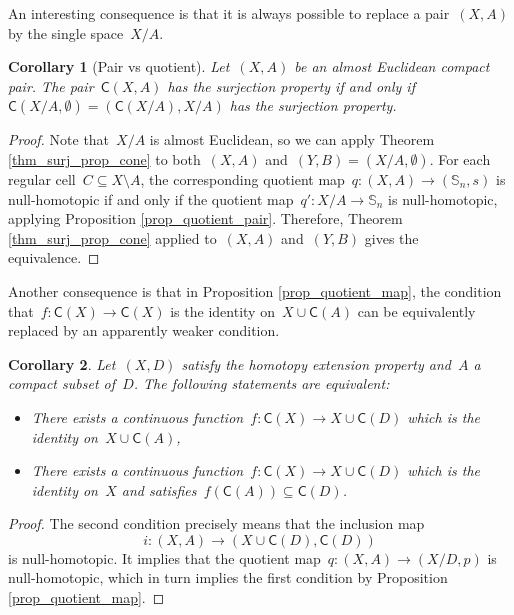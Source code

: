 \documentclass[english,11pt]{article}
\theoremstyle{plain}
\newtheorem{corollary}{Corollary}[section]
\theoremstyle{remark}
\theoremstyle{definition}
\newcommand{\Sp}{\mathbb{S}}
\newcommand{\C}[1]{\mathsf{C}(#1)}%
\begin{document}
An interesting consequence is that it is always possible to replace a pair~$(X,A)$ by the single space~$X/A$.
\begin{corollary}[Pair vs quotient]
Let~$(X,A)$ be an almost Euclidean compact pair. The pair~$\C{X,A}$ has the surjection property if and only if~$\C{X/A,\emptyset}=(\C{X/A},X/A)$ has the surjection property.
\end{corollary}
\begin{proof}
Note that~$X/A$ is almost Euclidean, so we can apply Theorem \ref{thm_surj_prop_cone} to both~$(X,A)$ and~$(Y,B)=(X/A,\emptyset)$. For each regular cell~$C\subseteq X\setminus A$, the corresponding quotient map~$q:(X,A)\to (\Sp_n,s)$ is null-homotopic if and only if the quotient map~$q':X/A\to\Sp_n$ is null-homotopic, applying Proposition \ref{prop_quotient_pair}. Therefore, Theorem \ref{thm_surj_prop_cone} applied to~$(X,A)$ and~$(Y,B)$ gives the equivalence.
\end{proof}

Another consequence is that in Proposition \ref{prop_quotient_map}, the condition that~$f:\C{X}\to\C{X}$ is the identity on~$X\cup \C{A}$ can be equivalently replaced by an apparently weaker condition.
\begin{corollary}
Let~$(X,D)$ satisfy the homotopy extension property and~$A$ a compact subset of~$D$. The following statements are equivalent:
\begin{itemize}
\item There exists a continuous function~$f:\C{X}\to X\cup\C{D}$ which is the identity on~$X\cup\C{A}$,
\item There exists a continuous function~$f:\C{X}\to X\cup\C{D}$ which is the identity on~$X$ and satisfies~$f(\C{A})\subseteq\C{D}$.
\end{itemize}
\end{corollary}
\begin{proof}
The second condition precisely means that the inclusion map
\begin{equation*}
i:(X,A)\to (X\cup\C{D},\C{D})
\end{equation*}
is null-homotopic. It implies that the quotient map~$q:(X,A)\to (X/D,p)$ is null-homotopic, which in turn implies the first condition by Proposition \ref{prop_quotient_map}.
\end{proof}

\end{document}
